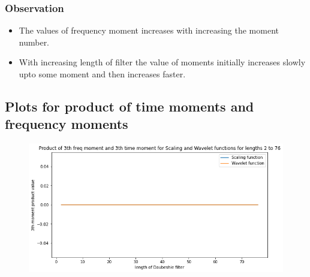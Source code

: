 \documentclass{article}
\begin{document}
\begin{figure}[H]
    \centering
    \qquad
    \label{fig:example}%
\end{figure}

\subsubsection{Observation}
\begin{itemize}
\item The values of frequency moment increases with increasing the moment number.
\item With increasing length of filter the value of moments initially increases slowly upto some moment and then increases faster.
\end{itemize}

\subsection{Plots for product of time moments and frequency moments}

\begin{figure}[H]
\begin{center}
\includegraphics[scale = 0.6]{prod3.png}
\end{center}
\end{figure}
\end{document}
